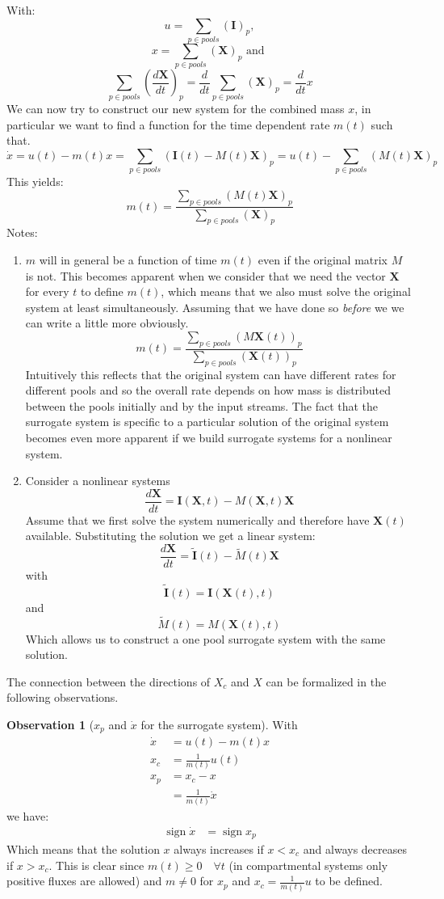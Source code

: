 \documentclass[journal abbreviation, manuscript]{copernicus}
\theoremstyle{definition}
\newtheorem{observation}{Observation}[section]
\newcommand{\X}{\mathbf{X}}
\newcommand{\I}{\mathbf{I}}
\DeclareMathOperator{\sign}{sign}
\begin{document}
With: 
$$
u=\sum_{p \in pools} (\I)_p, 
$$
$$
x = \sum_{p \in pools} (\X)_p
\text{ and }
$$ 
$$
\sum_{p \in pools} \left( \frac{d \X}{d t} \right)_p
=\frac{d}{d t}\sum_{p \in pools} (\X )_p
=\frac{d}{d t} x
$$
We can now try to construct our new system for the combined mass $x$, in particular we want to find a function for the time dependent rate $m(t)$ such that. 
$$
\dot{x}
=u(t)-m(t) x 
=\sum_{p \in pools} \left( \I(t) - M(t) \X \right)_p
=u(t)-\sum_{p \in pools} ( M(t) \X )_p
$$
This yields: 
$$
m(t) = \frac{
    \sum_{p \in pools} ( M(t) \X )_p
    }{
    \sum_{p \in pools} (\X)_p
    }
$$
Notes:
\begin{enumerate}
\item 
  $m$ will in general be a function of time $m(t)$ even if the original matrix $M$ is not.
  This becomes apparent when we consider that we need the vector $\X$ for every $t$ to define $m(t)$, which means that we also must solve the original system at least simultaneously.
  Assuming that we have done so \emph{before} we we can write a little more obviously.
  $$
  m(t) = \frac{
      \sum_{p \in pools} ( M \X(t) )_p
      }{
      \sum_{p \in pools} (\X(t))_p
      }
  $$
  Intuitively this reflects that the original system can have different rates for different pools and so the overall 
  rate depends on how mass is distributed between the pools initially and by the input streams. 
  The fact that the surrogate system is specific to a particular solution of the original system becomes even more apparent
  if we build surrogate systems for a nonlinear system. 
\item
  Consider a nonlinear systems
  $$
  \frac{d \X}{d t}= \I(\X,t) - M(\X,t) \X 
  $$
  Assume that we first solve the system numerically and therefore have $\X(t)$ available.
  Substituting the solution we get a linear system:
  $$
  \frac{d \X}{d t}= \tilde{\I}(t) - \tilde{M}(t) \X 
  $$
  with 
  $$
  \tilde{\I}(t)=\I(\X(t),t)
  $$
  and
  $$
  \tilde{M}(t)=M(\X(t),t)
  $$
  Which allows us to construct a one pool surrogate system with the same solution.
\end{enumerate}

The connection between the directions of $X_c$ and $X$ can be formalized in the following observations.

\begin{observation}[$x_p$ and $\dot{x}$ for the surrogate system]
With
\begin{align*}
\dot{x}   &=   u(t)-m(t)x              \\
x_c       &=   \frac{1}{m(t)} u(t)    \\
x_p       &=   x_c-x                  \\
          &=   \frac{1}{m(t)} \dot{x} 
\end{align*}
we have:
\begin{align}
\label{sign}
\sign \dot{x} &= \sign x_p
\end{align}
Which means that the solution $x$ always increases if $x<x_c$ and always decreases if $x>x_c$.
This is clear since $m(t) \ge 0 \quad \forall t$ (in compartmental systems only positive fluxes are allowed) and $m \ne 0$ for $x_p$ and $x_c=\frac{1}{m(t)} u$ to be defined.
\end{observation}
\end{document}

